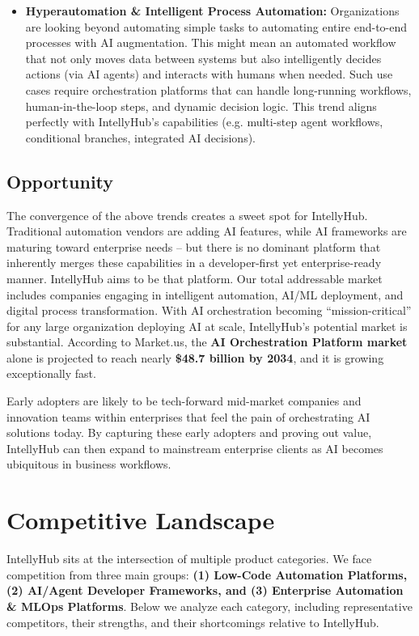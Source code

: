 \documentclass[11pt, a4paper, oneside]{article}
\begin{document}
\begin{itemize}
    \item \textbf{Hyperautomation \& Intelligent Process Automation:} Organizations are looking beyond automating simple tasks to automating entire end-to-end processes with AI augmentation. This might mean an automated workflow that not only moves data between systems but also intelligently decides actions (via AI agents) and interacts with humans when needed. Such use cases require orchestration platforms that can handle long-running workflows, human-in-the-loop steps, and dynamic decision logic. This trend aligns perfectly with IntellyHub's capabilities (e.g. multi-step agent workflows, conditional branches, integrated AI decisions).
\end{itemize}

\subsection{Opportunity}
The convergence of the above trends creates a sweet spot for IntellyHub. Traditional automation vendors are adding AI features, while AI frameworks are maturing toward enterprise needs – but there is no dominant platform that inherently merges these capabilities in a developer-first yet enterprise-ready manner. IntellyHub aims to be that platform. Our total addressable market includes companies engaging in intelligent automation, AI/ML deployment, and digital process transformation. With AI orchestration becoming “mission-critical” for any large organization deploying AI at scale, IntellyHub's potential market is substantial. According to Market.us, the \textbf{AI Orchestration Platform market} alone is projected to reach nearly \textbf{\$48.7 billion by 2034}\cite{AIOrch}, and it is growing exceptionally fast. 

Early adopters are likely to be tech-forward mid-market companies and innovation teams within enterprises that feel the pain of orchestrating AI solutions today. By capturing these early adopters and proving out value, IntellyHub can then expand to mainstream enterprise clients as AI becomes ubiquitous in business workflows.

\section{Competitive Landscape}
IntellyHub sits at the intersection of multiple product categories. We face competition from three main groups: \textbf{(1) Low-Code Automation Platforms, (2) AI/Agent Developer Frameworks, and (3) Enterprise Automation \& MLOps Platforms}. Below we analyze each category, including representative competitors, their strengths, and their shortcomings relative to IntellyHub.
\end{document}
